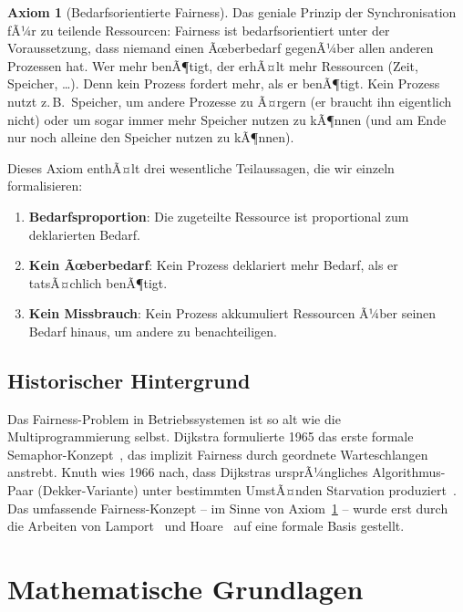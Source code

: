﻿\documentclass[a4paper,12pt]{article}
\theoremstyle{definition}
\newtheorem{axiom}{Axiom}
\begin{document}
\begin{axiom}[Bedarfsorientierte Fairness]
\label{ax:fairness}
Das geniale Prinzip der Synchronisation fÃ¼r zu teilende Ressourcen:
Fairness ist bedarfsorientiert unter der Voraussetzung, dass niemand
einen Ãœberbedarf gegenÃ¼ber allen anderen Prozessen hat.
Wer mehr benÃ¶tigt, der erhÃ¤lt mehr Ressourcen (Zeit, Speicher, \ldots).
Denn kein Prozess fordert mehr, als er benÃ¶tigt.
Kein Prozess nutzt z.\,B.\ Speicher, um andere Prozesse zu Ã¤rgern
(er braucht ihn eigentlich nicht) oder um sogar immer mehr Speicher
nutzen zu kÃ¶nnen (und am Ende nur noch alleine den Speicher nutzen
zu kÃ¶nnen).
\end{axiom}

Dieses Axiom enthÃ¤lt drei wesentliche Teilaussagen, die wir einzeln
formalisieren:

\begin{enumerate}
  \item \textbf{Bedarfsproportion}: Die zugeteilte Ressource ist
        proportional zum deklarierten Bedarf.
  \item \textbf{Kein Ãœberbedarf}: Kein Prozess deklariert mehr Bedarf,
        als er tatsÃ¤chlich benÃ¶tigt.
  \item \textbf{Kein Missbrauch}: Kein Prozess akkumuliert Ressourcen
        Ã¼ber seinen Bedarf hinaus, um andere zu benachteiligen.
\end{enumerate}

\subsection{Historischer Hintergrund}

Das Fairness-Problem in Betriebssystemen ist so alt wie die
Multiprogrammierung selbst. Dijkstra formulierte 1965 das erste
formale Semaphor-Konzept~\cite{dijkstra1965}, das implizit Fairness
durch geordnete Warteschlangen anstrebt. Knuth wies 1966 nach, dass
Dijkstras ursprÃ¼ngliches Algorithmus-Paar (Dekker-Variante)
unter bestimmten UmstÃ¤nden Starvation produziert~\cite{knuth1966}.
Das umfassende Fairness-Konzept -- im Sinne von Axiom~\ref{ax:fairness}
-- wurde erst durch die Arbeiten von Lamport~\cite{lamport1974new}
und Hoare~\cite{hoare1974monitors} auf eine formale Basis gestellt.

\section{Mathematische Grundlagen}
\label{sec:grundlagen}
\end{document}

